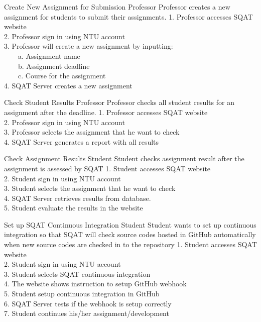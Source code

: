 \usecases
    {Create New Assignment for Submission}
    {Professor}
    {Professor creates a new assignment for students to submit their assignments. }
    {
        1. Professor accesses SQAT website\\
        2. Professor sign in using NTU account\\
        3. Professor will create a new assignment by inputting:\\
        \ \ \ \ a. Assignment name\\
        \ \ \ \ b. Assignment deadline\\
        \ \ \ \ c. Course for the assignment\\
        4. SQAT Server creates a new assignment
    }
    
\usecases
    {Check Student Results}
    {Professor}
    {Professor checks all student results for an assignment after the deadline. }
    {
        1. Professor accesses SQAT website\\
        2. Professor sign in using NTU account\\
        3. Professor selects the assignment that he want to check\\
        4. SQAT Server generates a report with all results
    }

\usecases
    {Check Assignment Results}
    {Student}
    {Student checks assignment result after the assignment is assessed by SQAT}
    {
        1. Student accesses SQAT website\\
        2. Student sign in using NTU account\\
        3. Student selects the assignment that he want to check\\
        4. SQAT Server retrieves results from database.\\
        5. Student evaluate the results in the website
    }

\usecases
    {Set up SQAT Continuous Integration}
    {Student}
    {Student wants to set up continuous integration so that SQAT will check source codes hosted in GitHub automatically when new source codes are checked in to the repository}
    {
        1. Student accesses SQAT website\\
        2. Student sign in using NTU account\\
        3. Student selects SQAT continuous integration\\
        4. The website shows instruction to setup GitHub webhook \\
        5. Student setup continuous integration in GitHub\\
        6. SQAT Server tests if the webhook is setup correctly\\
        7. Student continues his/her assignment/development
    }

